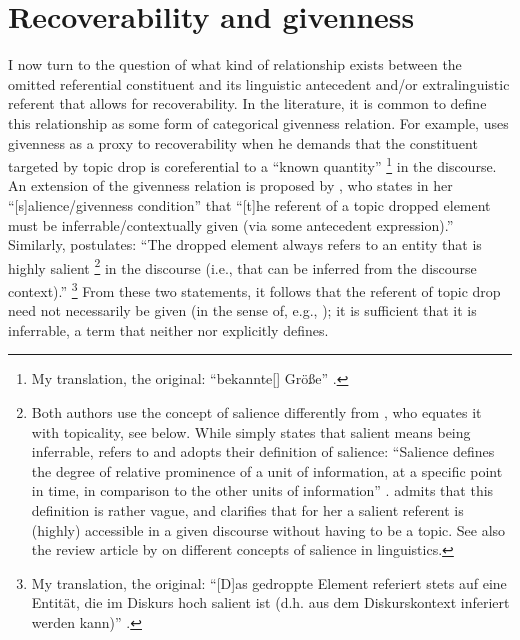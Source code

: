 
\largerpage
\section{Recoverability and givenness}\label{sec:recover.given} 
I now turn to the question of what kind of relationship exists between the omitted referential constituent and its linguistic antecedent  and/or extralinguistic referent that allows for recoverability.
In the literature, it is common to define this relationship as some form of categorical givenness relation.
For example, \citet[27]{fries1988} uses givenness as a proxy to recoverability when he demands that the constituent targeted by topic drop is coreferential to a ``known quantity''%
\footnote{My translation, the original: ``bekannte[] Größe'' \citep[27]{fries1988}.}
%
in the discourse.
An extension of the givenness relation is proposed by \citet[19]{trutkowski2016}, who states in her ``[s]alience/givenness condition'' that ``[t]he referent of a topic dropped element must be inferrable/contextually given (via some antecedent  expression).''
Similarly, \citet[150]{freywald2020} postulates:
``The dropped element always refers to an entity that is highly salient%
\footnote{Both authors use the concept of salience  differently from \citet{ariel1990}, who equates it with topicality, see below.
While \citet{freywald2020} simply states that salient means being inferrable, \citet{trutkowski2016} refers to \citet{chiarcos.etal2011} and adopts their definition of salience:
``Salience defines the degree of relative prominence of a unit of information, at a specific point in time, in comparison to the other units of information'' \citep[2]{chiarcos.etal2011}.
\citet[20]{trutkowski2016} admits that this definition is rather vague, and clarifies that for her a salient referent is (highly) accessible in a given discourse without having to be a topic.  
See also the review article by \citet{boswijk.coler2020} on different concepts of salience in linguistics.
}
%
 in the discourse (i.e., that can be inferred from the discourse context).''%
\footnote{My translation, the original: ``[D]as gedroppte Element referiert stets auf eine Entität, die im Diskurs hoch salient ist (d.h. aus dem Diskurskontext inferiert werden kann)'' \citep[150]{freywald2020}.}
%
From these two statements, it follows that the referent of topic drop need not necessarily be given (in the sense of, e.g., \citet{prince1981}); it is sufficient that it is inferrable, a term that neither \citet{trutkowski2016} nor \citet{freywald2020} explicitly defines.

